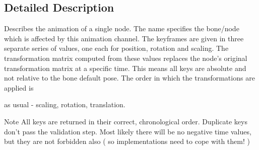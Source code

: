 \subsection{Detailed Description}
Describes the animation of a single node. The name specifies the bone/node which is affected by this animation channel. The keyframes are given in three separate series of values, one each for position, rotation and scaling. The transformation matrix computed from these values replaces the node's original transformation matrix at a specific time. This means all keys are absolute and not relative to the bone default pose. The order in which the transformations are applied is
\begin{DoxyItemize}
\item as usual -\/ scaling, rotation, translation.
\end{DoxyItemize}

\begin{DoxyNote}{Note}
All keys are returned in their correct, chronological order. Duplicate keys don't pass the validation step. Most likely there will be no negative time values, but they are not forbidden also ( so implementations need to cope with them! ) 
\end{DoxyNote}



